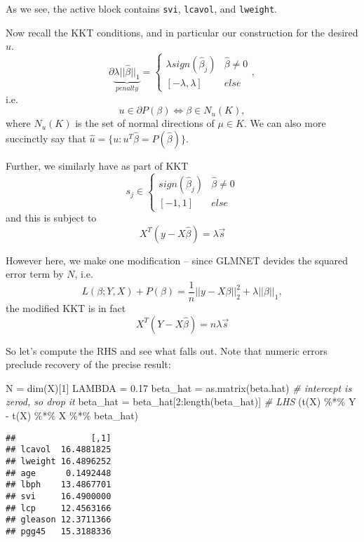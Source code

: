 \documentclass[
]{article}
\newenvironment{Shaded}{\begin{snugshade}}{\end{snugshade}}
\newcommand{\CommentTok}[1]{\textcolor[rgb]{0.56,0.35,0.01}{\textit{#1}}}
\newcommand{\DecValTok}[1]{\textcolor[rgb]{0.00,0.00,0.81}{#1}}
\newcommand{\FloatTok}[1]{\textcolor[rgb]{0.00,0.00,0.81}{#1}}
\newcommand{\FunctionTok}[1]{\textcolor[rgb]{0.00,0.00,0.00}{#1}}
\newcommand{\NormalTok}[1]{#1}
\newcommand{\OtherTok}[1]{\textcolor[rgb]{0.56,0.35,0.01}{#1}}
\newcommand{\SpecialCharTok}[1]{\textcolor[rgb]{0.00,0.00,0.00}{#1}}
\begin{document}
As we see, the active block contains \texttt{svi}, \texttt{lcavol}, and
\texttt{lweight}.

Now recall the KKT conditions, and in particular our construction for
the desired \(u\). \[
\partial \underbrace{\lambda ||\hat\beta||_1}_{penalty}
=
\begin{cases}
\lambda sign(\hat\beta_j) & \hat\beta\neq 0\\
[-\lambda, \lambda] & else
\end{cases},
\] i.e. \[
u \in \partial P(\beta) \iff \beta \in N_{u}(K),
\] where \(N_{u}(K)\) is the set of normal directions of \(\mu\in K\).
We can also more succinctly say that
\(\hat u = \{u: u^T\hat\beta = P(\hat\beta)\}\).

Further, we similarly have as part of KKT \[
s_j \in \begin{cases}
sign(\hat\beta_j) & \hat\beta\neq 0\\
[-1, 1] & else
\end{cases}
\] and this is subject to \[
X^T(y - X\hat\beta) = \lambda \vec s
\]

However here, we make one modification -- since GLMNET devides the
squared error term by \(N\), i.e. \[
L(\beta; Y, X) + P(\beta) = \frac{1}{n}||y - X\beta||_2^2 + \lambda ||\beta||_1,
\] the modified KKT is in fact \[
X^T(Y - X\hat\beta) = n\lambda \vec s
\]

So let's compute the RHS and see what falls out. Note that numeric
errors preclude recovery of the precise result:

\begin{Shaded}
\begin{Highlighting}[]
\NormalTok{N }\OtherTok{=} \FunctionTok{dim}\NormalTok{(X)[}\DecValTok{1}\NormalTok{]}
\NormalTok{LAMBDA }\OtherTok{=} \FloatTok{0.17}
\NormalTok{beta\_hat }\OtherTok{=} \FunctionTok{as.matrix}\NormalTok{(beta.hat)}
\CommentTok{\# intercept is zero\textquotesingle{}d, so drop it}
\NormalTok{beta\_hat }\OtherTok{=}\NormalTok{ beta\_hat[}\DecValTok{2}\SpecialCharTok{:}\FunctionTok{length}\NormalTok{(beta\_hat)]}
\CommentTok{\# LHS}
\NormalTok{(}\FunctionTok{t}\NormalTok{(X) }\SpecialCharTok{\%*\%}\NormalTok{ Y }\SpecialCharTok{{-}} \FunctionTok{t}\NormalTok{(X) }\SpecialCharTok{\%*\%}\NormalTok{ X }\SpecialCharTok{\%*\%}\NormalTok{ beta\_hat)}
\end{Highlighting}
\end{Shaded}

\begin{verbatim}
##               [,1]
## lcavol  16.4881825
## lweight 16.4896252
## age      0.1492448
## lbph    13.4867701
## svi     16.4900000
## lcp     12.4563166
## gleason 12.3711366
## pgg45   15.3188336
\end{verbatim}
\end{document}
